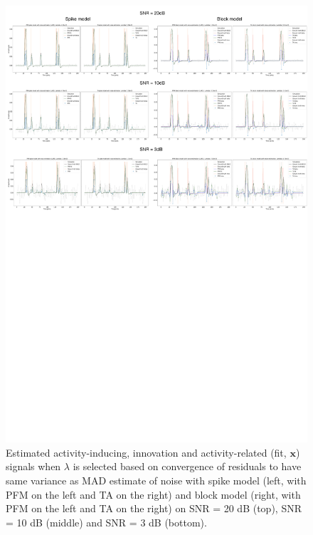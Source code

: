\begin{figure}[t!]
    \begin{center}
        \includegraphics[width=\textwidth]{figures/std_based.pdf}
    \end{center}
    \caption{Estimated activity-inducing, innovation and activity-related (fit, \(\mathbf{x}\)) signals when \(\lambda\) is selected based on convergence of residuals to have same variance as MAD estimate of noise with spike model (left, with PFM on the left and TA on the right) and block model (right, with PFM on the left and TA on the right) on SNR = 20 dB (top), SNR = 10 dB (middle) and SNR = 3 dB (bottom).}
\label{fig:std}
\end{figure}

